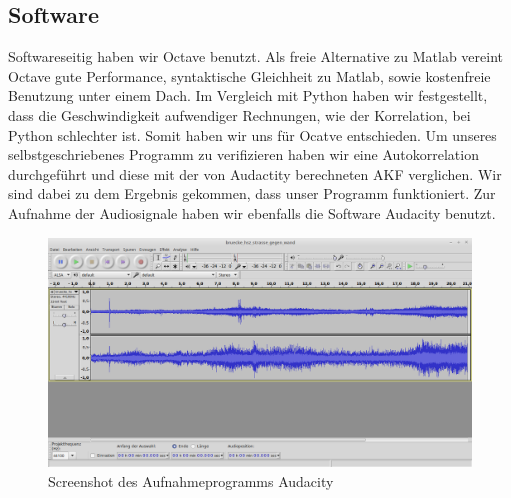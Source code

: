 \subsection{Software}
Softwareseitig haben wir Octave benutzt. Als freie Alternative zu Matlab vereint Octave gute Performance, syntaktische Gleichheit zu Matlab, sowie kostenfreie Benutzung unter einem Dach. Im Vergleich mit Python haben wir festgestellt, dass die Geschwindigkeit aufwendiger Rechnungen, wie der Korrelation, bei Python schlechter ist. Somit haben wir uns für Ocatve entschieden. Um unseres selbstgeschriebenes Programm zu verifizieren haben wir eine Autokorrelation durchgeführt und diese mit der von Audactity berechneten AKF verglichen. Wir sind dabei zu dem Ergebnis gekommen, dass unser Programm funktioniert. Zur Aufnahme der Audiosignale haben wir ebenfalls die Software Audacity benutzt.
\begin{figure}[ht!]
  \centering
  \includegraphics[width=\textwidth]{img/audacity}
  \caption{Screenshot des Aufnahmeprogramms Audacity}
  \label{audacity}
\end{figure}

